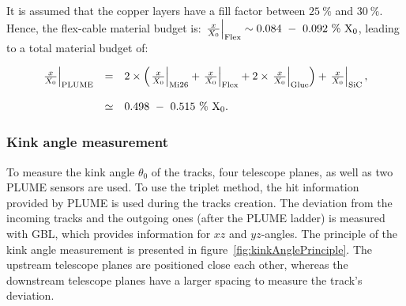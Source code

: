      It is assumed that the copper layers have a fill factor between $25~\%$ and $30~\%$.
     Hence, the flex-cable material budget is: $\left. \frac{x}{X_0} \right|_{\rm{Flex}} \sim 0.084~-~0.092~\%~\rm{X_0}$, leading to a total material budget of:

     \begin{equation}
       \begin{array}{lcl}
         \left. \frac{x}{X_0} \right|_{\rm{PLUME}} & = & 2 \times \left( \left. \frac{x}{X_0} \right|_{\rm{Mi26}} + \left. \frac{x}{X_0} \right|_{\rm{Flex}} + 2 \times \left. \frac{x}{X_0} \right|_{\rm{Glue}}\right) + \left. \frac{x}{X_0} \right|_{\rm{SiC}}, \\
         \\
         & \simeq & 0.498~-~0.515~\%~\rm{X_0}.
       \end{array}
       \label{eq:X0_theory}
     \end{equation}


     \subsubsection{Kink angle measurement}

   To measure the kink angle $\theta_{0}$ of the tracks, four telescope planes, as well as two \gls{PLUME} sensors are used.
   To use the triplet method, the hit information provided by \gls{PLUME} is used during the tracks creation.
   The deviation from the incoming tracks and the outgoing ones (after the \gls{PLUME} ladder) is measured with \gls{GBL}, which provides information for $xz$ and $yz$-angles.
   The principle of the kink angle measurement is presented in figure~\ref{fig:kinkAnglePrinciple}.
   The upstream telescope planes are positioned close each other, whereas the downstream telescope planes have a larger spacing to measure the track's deviation.
  
